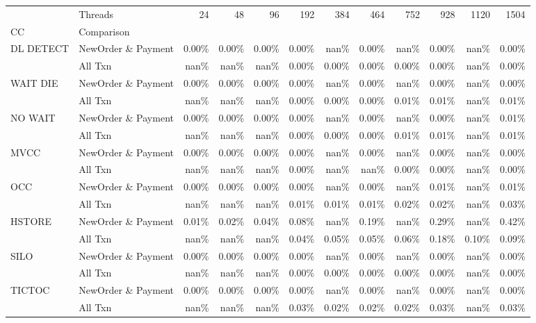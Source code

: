 \begin{tabular}{llrrrrrrrrrr}
\toprule
       & Threads &  24   &  48   &  96   &  192  &  384  &  464  &  752  &  928  &  1120 &  1504 \\
CC & Comparison &       &       &       &       &       &       &       &       &       &       \\
\midrule
DL DETECT & NewOrder \& Payment & 0.00\% & 0.00\% & 0.00\% & 0.00\% &  nan\% & 0.00\% &  nan\% & 0.00\% &  nan\% & 0.00\% \\
       & All Txn &  nan\% &  nan\% &  nan\% & 0.00\% & 0.00\% & 0.00\% & 0.00\% & 0.00\% &  nan\% & 0.00\% \\
WAIT DIE & NewOrder \& Payment & 0.00\% & 0.00\% & 0.00\% & 0.00\% &  nan\% & 0.00\% &  nan\% & 0.00\% &  nan\% & 0.00\% \\
       & All Txn &  nan\% &  nan\% &  nan\% & 0.00\% & 0.00\% & 0.00\% & 0.01\% & 0.01\% &  nan\% & 0.01\% \\
NO WAIT & NewOrder \& Payment & 0.00\% & 0.00\% & 0.00\% & 0.00\% &  nan\% & 0.00\% &  nan\% & 0.00\% &  nan\% & 0.01\% \\
       & All Txn &  nan\% &  nan\% &  nan\% & 0.00\% & 0.00\% & 0.00\% & 0.01\% & 0.01\% &  nan\% & 0.01\% \\
MVCC & NewOrder \& Payment & 0.00\% & 0.00\% & 0.00\% & 0.00\% &  nan\% & 0.00\% &  nan\% & 0.00\% &  nan\% & 0.00\% \\
       & All Txn &  nan\% &  nan\% &  nan\% & 0.00\% &  nan\% &  nan\% & 0.00\% & 0.00\% &  nan\% & 0.00\% \\
OCC & NewOrder \& Payment & 0.00\% & 0.00\% & 0.00\% & 0.00\% &  nan\% & 0.00\% &  nan\% & 0.01\% &  nan\% & 0.01\% \\
       & All Txn &  nan\% &  nan\% &  nan\% & 0.01\% & 0.01\% & 0.01\% & 0.02\% & 0.02\% &  nan\% & 0.03\% \\
HSTORE & NewOrder \& Payment & 0.01\% & 0.02\% & 0.04\% & 0.08\% &  nan\% & 0.19\% &  nan\% & 0.29\% &  nan\% & 0.42\% \\
       & All Txn &  nan\% &  nan\% &  nan\% & 0.04\% & 0.05\% & 0.05\% & 0.06\% & 0.18\% & 0.10\% & 0.09\% \\
SILO & NewOrder \& Payment & 0.00\% & 0.00\% & 0.00\% & 0.00\% &  nan\% & 0.00\% &  nan\% & 0.00\% &  nan\% & 0.00\% \\
       & All Txn &  nan\% &  nan\% &  nan\% & 0.00\% & 0.00\% & 0.00\% & 0.00\% & 0.00\% &  nan\% & 0.00\% \\
TICTOC & NewOrder \& Payment & 0.00\% & 0.00\% & 0.00\% & 0.00\% &  nan\% & 0.00\% &  nan\% & 0.00\% &  nan\% & 0.00\% \\
       & All Txn &  nan\% &  nan\% &  nan\% & 0.03\% & 0.02\% & 0.02\% & 0.02\% & 0.03\% &  nan\% & 0.03\% \\
\bottomrule
\end{tabular}
